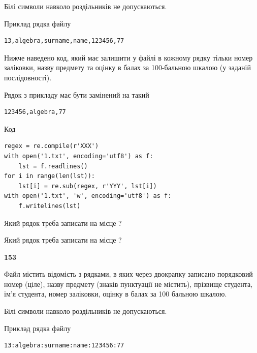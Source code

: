 Білі символи навколо роздільників не допускаються.

Приклад рядка файлу



\begin{verbatim}
13,algebra,surname,name,123456,77
\end{verbatim}


Нижче наведено код, який має залишити у файлі в кожному рядку тільки номер заліковки, назву предмету та оцінку в балах за 100-бальною шкалою (у заданій послі\-дов\-ності).

Рядок з прикладу має бути замінений на такий



\begin{verbatim}
123456,algebra,77
\end{verbatim}




Код



\begin{verbatim}
regex = re.compile(r'XXX')
with open('1.txt', encoding='utf8') as f:
    lst = f.readlines()
for i in range(len(lst)):
    lst[i] = re.sub(regex, r'YYY', lst[i])
with open('1.txt', 'w', encoding='utf8') as f:
    f.writelines(lst)
\end{verbatim}







Який рядок треба записати на місце  ?\par
\vspace{5mm}


Який рядок треба записати на місце  ?\par


\newpage

{\begin {center}\textbf{ 153}\end {center}}\par
Файл  містить відомість з рядками, в яких через двокрапку записа\-но поряд\-ковий номер (ціле), назву предмету (знаків пунктуації не містить), прізвище студента, ім'я студента, номер заліковки, оцінку в балах за 100 бальною шкалою.

Білі символи навколо роздільників не допускаються.

Приклад рядка файлу



\begin{verbatim}
13:algebra:surname:name:123456:77
\end{verbatim}


